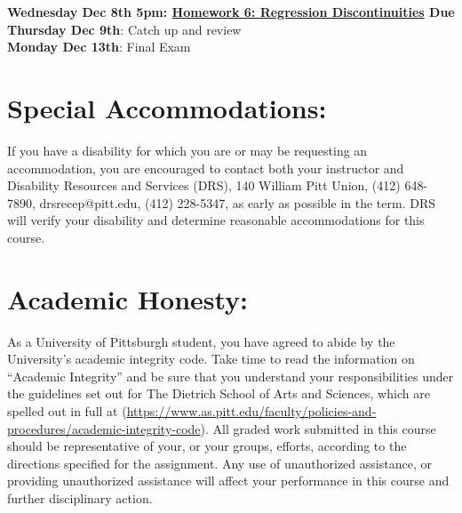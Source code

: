 \documentclass[a4paper, 10pt]{article}
\begin{document}
\noindent\textbf{Wednesday Dec 8th 5pm: \underline{Homework 6: Regression Discontinuities} Due}\\

\noindent\textbf{Thursday Dec 9th}: Catch up and review\\

\noindent\textbf{Monday Dec 13th}: Final Exam\\

\section*{Special Accommodations:}
If you have a disability for which you are or may be requesting an accommodation, you are encouraged to contact both your instructor and Disability Resources and Services (DRS), 140 William Pitt Union, (412) 648-7890, drsrecep@pitt.edu, (412) 228-5347, as early as possible in the term. DRS will verify your disability and determine reasonable accommodations for this course.


\section*{Academic Honesty:}
As a University of Pittsburgh student, you have agreed to abide by the University's academic integrity code. Take time to read the information on “Academic Integrity” and be sure that you understand your responsibilities under the guidelines set out for The Dietrich School of Arts and Sciences, which are spelled out in full at (\href{https://www.as.pitt.edu/faculty/policies-and-procedures/academic-integrity-code}{https://www.as.pitt.edu/faculty/policies-and-procedures/academic-integrity-code}). All graded work submitted in this course should be representative of your, or your groups, efforts, according to the directions specified for the assignment. Any use of unauthorized assistance, or providing unauthorized assistance will affect your performance in this course and further disciplinary action.
\end{document}
